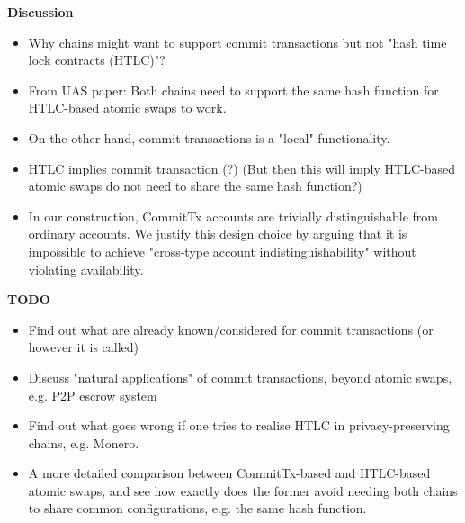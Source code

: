\documentclass{article}      	%
\begin{document}
\begin{todobox}
\textbf{Discussion}
\begin{itemize}
    \item Why chains might want to support commit transactions but not "hash time lock contracts (HTLC)"? 
    \item From UAS paper: Both chains need to support the same hash function for HTLC-based atomic swaps to work. 
    \item On the other hand, commit transactions is a "local" functionality. 
    \item HTLC implies commit transaction (?) (But then this will imply HTLC-based atomic swaps do not need to share the same hash function?)
    \item In our construction, CommitTx accounts are trivially distinguishable from ordinary accounts. We justify this design choice by arguing that it is impossible to achieve "cross-type account indistinguishability" without violating availability.
\end{itemize}
\textbf{TODO}
\begin{itemize}
    \item Find out what are already known/considered for commit transactions (or however it is called)
    \item Discuss "natural applications" of commit transactions, beyond atomic swaps, e.g. P2P escrow system 
    \item Find out what goes wrong if one tries to realise HTLC in privacy-preserving chains, e.g. Monero.
    \item A more detailed comparison between CommitTx-based and HTLC-based atomic swaps, and see how exactly does the former avoid needing both chains to share common configurations, e.g. the same hash function.
\end{itemize}
\end{todobox}







\end{document}

